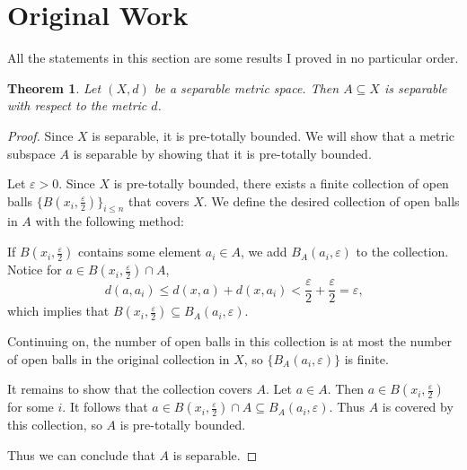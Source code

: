 \documentclass{article}
\theoremstyle{plain} %
\newtheorem{thm}{Theorem}
\numberwithin{thm}{section} %
\theoremstyle{definition}
\begin{document}
    \section{Original Work}
    All the statements in this section are some results I proved in no particular order.
    \begin{thm}
        Let \((X, d)\) be a separable metric space. Then \(A \subseteq X\) is separable with respect to the metric \(d\).
    \end{thm}
    \begin{proof}
        Since \(X\) is separable, it is pre-totally bounded. We will show that a metric subspace \(A\) is separable by showing that it is pre-totally bounded.

        Let \(\varepsilon > 0\). Since \(X\) is pre-totally bounded, there exists a finite collection of open balls \(\{ B(x_i, \frac{\varepsilon}{2})\}_{i\leq n}\) that covers \(X\). We define the desired collection of open balls in \(A\) with the following method:

        If \(B(x_i, \frac{\varepsilon}{2})\) contains some element \(a_i \in A\), we add \(B_A(a_i, \varepsilon)\) to the collection. Notice for \(a \in B(x_i, \frac{\varepsilon}{2}) \cap A\),
        \[
            d(a,a_i) \leq d(x, a) + d(x,a_i) < \frac{\varepsilon}{2} + \frac{\varepsilon}{2} = \varepsilon \text{,} 
        \]
        which implies that \(B(x_i, \frac{\varepsilon}{2}) \subseteq B_A(a_i, \varepsilon)\).

        Continuing on, the number of open balls in this collection is at most the number of open balls in the original collection in \(X\), so \(\{B_A(a_i, \varepsilon)\}\) is finite.

        It remains to show that the collection covers \(A\). Let \(a \in A\). Then \(a \in B(x_i, \frac{\varepsilon}{2})\) for some \(i\). It follows that \(a \in B(x_i,\frac{\varepsilon}{2})\cap A \subseteq B_A(a_i, \varepsilon)\). Thus \(A\) is covered by this collection, so \(A\) is pre-totally bounded.

        Thus we can conclude that \(A\) is separable.

    \end{proof}
\end{document}
